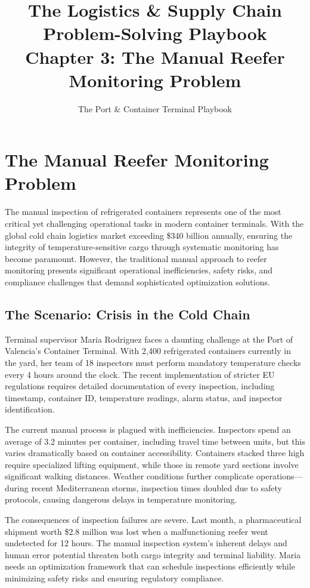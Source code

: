 \documentclass{article}
\title{\textbf{The Logistics \& Supply Chain Problem-Solving Playbook}\\
\large Chapter 3: The Manual Reefer Monitoring Problem}
\author{The Port \& Container Terminal Playbook}
\date{}
\begin{document}
\maketitle

\section{The Manual Reefer Monitoring Problem}

The manual inspection of refrigerated containers represents one of the most critical yet challenging operational tasks in modern container terminals. With the global cold chain logistics market exceeding \$340 billion annually, ensuring the integrity of temperature-sensitive cargo through systematic monitoring has become paramount. However, the traditional manual approach to reefer monitoring presents significant operational inefficiencies, safety risks, and compliance challenges that demand sophisticated optimization solutions.

\subsection{The Scenario: Crisis in the Cold Chain}

Terminal supervisor Maria Rodriguez faces a daunting challenge at the Port of Valencia's Container Terminal. With 2,400 refrigerated containers currently in the yard, her team of 18 inspectors must perform mandatory temperature checks every 4 hours around the clock. The recent implementation of stricter EU regulations requires detailed documentation of every inspection, including timestamp, container ID, temperature readings, alarm status, and inspector identification.

The current manual process is plagued with inefficiencies. Inspectors spend an average of 3.2 minutes per container, including travel time between units, but this varies dramatically based on container accessibility. Containers stacked three high require specialized lifting equipment, while those in remote yard sections involve significant walking distances. Weather conditions further complicate operations---during recent Mediterranean storms, inspection times doubled due to safety protocols, causing dangerous delays in temperature monitoring.

The consequences of inspection failures are severe. Last month, a pharmaceutical shipment worth \$2.8 million was lost when a malfunctioning reefer went undetected for 12 hours. The manual inspection system's inherent delays and human error potential threaten both cargo integrity and terminal liability. Maria needs an optimization framework that can schedule inspections efficiently while minimizing safety risks and ensuring regulatory compliance.
\end{document}
